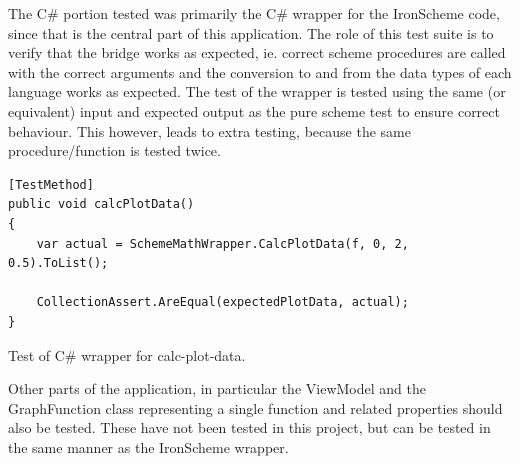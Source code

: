 \documentclass[a4paper,12pt]{article}
\newcommand{\code}[1]{{\fontfamily{pcr}\selectfont #1}}
\begin{document}
The C\# portion tested was primarily the C\# wrapper for the IronScheme code, since that is the central part of this application. The role of this test suite is to verify that the bridge works as expected, ie. correct scheme procedures are called with the correct arguments and the conversion to and from the data types of each language works as expected. The test of the wrapper is tested using the same (or equivalent) input and expected output as the pure scheme test to ensure correct behaviour. This however, leads to extra testing, because the same procedure/function is tested twice.

\begin{listing}[H]
\begin{verbatim}
[TestMethod]
public void calcPlotData()
{
    var actual = SchemeMathWrapper.CalcPlotData(f, 0, 2, 0.5).ToList();

    CollectionAssert.AreEqual(expectedPlotData, actual);
}
\end{verbatim}	

\caption{Test of C\# wrapper for \code{calc-plot-data}.}
\label{lst:SchemeTest}
\end{listing}

Other parts of the application, in particular the ViewModel and  the GraphFunction class representing a single function and related properties should also be tested. These have not been tested in this project, but can be tested in the same manner as the IronScheme wrapper. 

	
\end{document}
